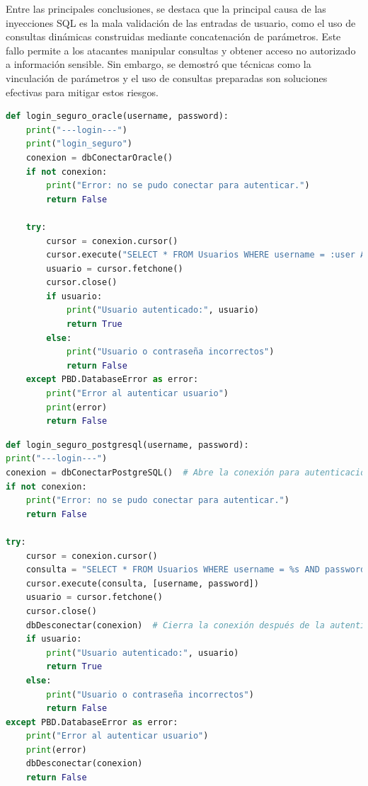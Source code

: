 \documentclass[a4paper,12pt]{article}
\begin{document}
\vspace{0,5cm}

Entre las principales conclusiones, se destaca que la principal causa de las inyecciones SQL es la mala validación de las entradas de usuario, como el uso de consultas dinámicas construidas mediante concatenación de parámetros. Este fallo permite a los atacantes manipular consultas y obtener acceso no autorizado a información sensible. Sin embargo, se demostró que técnicas como la vinculación de parámetros y el uso de consultas preparadas son soluciones efectivas para mitigar estos riesgos.

\vspace{0,5cm}

\begin{lstlisting}[language=Python]
def login_seguro_oracle(username, password):
    print("---login---")
    print("login_seguro")
    conexion = dbConectarOracle()
    if not conexion:
        print("Error: no se pudo conectar para autenticar.")
        return False

    try:
        cursor = conexion.cursor()
        cursor.execute("SELECT * FROM Usuarios WHERE username = :user AND password = :pass", (username, password))
        usuario = cursor.fetchone()
        cursor.close()
        if usuario:
            print("Usuario autenticado:", usuario)
            return True
        else:
            print("Usuario o contraseña incorrectos")
            return False
    except PBD.DatabaseError as error:
        print("Error al autenticar usuario")
        print(error)
        return False
\end{lstlisting}

\vspace{0,5cm}

\begin{lstlisting}[language=Python]
def login_seguro_postgresql(username, password):
print("---login---")
conexion = dbConectarPostgreSQL()  # Abre la conexión para autenticación
if not conexion:
    print("Error: no se pudo conectar para autenticar.")
    return False

try:
    cursor = conexion.cursor()
    consulta = "SELECT * FROM Usuarios WHERE username = %s AND password = %s"
    cursor.execute(consulta, [username, password])
    usuario = cursor.fetchone()
    cursor.close()
    dbDesconectar(conexion)  # Cierra la conexión después de la autenticación
    if usuario:
        print("Usuario autenticado:", usuario)
        return True
    else:
        print("Usuario o contraseña incorrectos")
        return False
except PBD.DatabaseError as error:
    print("Error al autenticar usuario")
    print(error)
    dbDesconectar(conexion)
    return False
\end{lstlisting}
\end{document}
